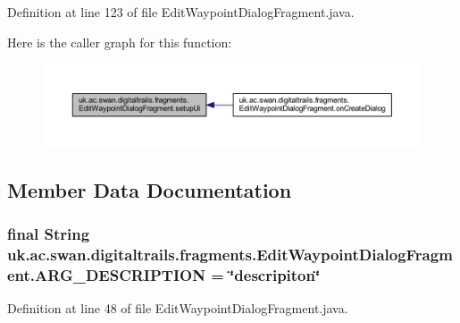 Definition at line 123 of file Edit\+Waypoint\+Dialog\+Fragment.\+java.



Here is the caller graph for this function\+:\nopagebreak
\begin{figure}[H]
\begin{center}
\leavevmode
\includegraphics[width=350pt]{classuk_1_1ac_1_1swan_1_1digitaltrails_1_1fragments_1_1_edit_waypoint_dialog_fragment_ada4d70217eaebd633c3e15fa620d1512_icgraph}
\end{center}
\end{figure}




\subsection{Member Data Documentation}
\hypertarget{classuk_1_1ac_1_1swan_1_1digitaltrails_1_1fragments_1_1_edit_waypoint_dialog_fragment_ad587605871836c32d04d09b650dddfe1}{
\subsubsection[{A\+R\+G\+\_\+\+D\+E\+S\+C\+R\+I\+P\+T\+I\+O\+N}]{\setlength{\rightskip}{0pt plus 5cm}final String uk.\+ac.\+swan.\+digitaltrails.\+fragments.\+Edit\+Waypoint\+Dialog\+Fragment.\+A\+R\+G\+\_\+\+D\+E\+S\+C\+R\+I\+P\+T\+I\+O\+N = \char`\"{}descripiton\char`\"{}\hspace{0.3cm}{\ttfamily [static]}}}\label{classuk_1_1ac_1_1swan_1_1digitaltrails_1_1fragments_1_1_edit_waypoint_dialog_fragment_ad587605871836c32d04d09b650dddfe1}


Definition at line 48 of file Edit\+Waypoint\+Dialog\+Fragment.\+java.

